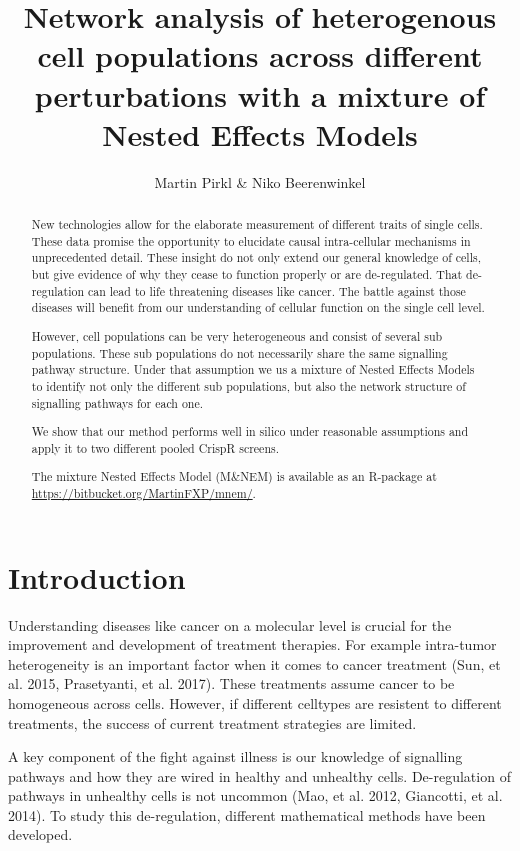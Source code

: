 \documentclass[12pt]{article}
\title{Network analysis of heterogenous cell populations across different perturbations with a mixture of Nested Effects Models}
\author{Martin Pirkl \& Niko Beerenwinkel}
\begin{document}
\maketitle

\begin{abstract}
New technologies allow for the elaborate measurement of different traits of single cells. These data promise the opportunity to elucidate causal intra-cellular mechanisms in unprecedented detail. These insight do not only extend our general knowledge of cells, but give evidence of why they cease to function properly or are de-regulated. That de-regulation can lead to life threatening diseases like cancer. The battle against those diseases will benefit from our understanding of cellular function on the single cell level.

However, cell populations can be very heterogeneous and consist of several sub populations. These sub populations do not necessarily share the same signalling pathway structure. Under that assumption we us a mixture of Nested Effects Models to identify not only the different sub populations, but also the network structure of signalling pathways for each one.

We show that our method performs well in silico under reasonable assumptions and apply it to two different pooled CrispR screens.

The mixture Nested Effects Model (M\&NEM) is available as an R-package at \url{https://bitbucket.org/MartinFXP/mnem/}.
\end{abstract}

\section{Introduction}
Understanding diseases like cancer on a molecular level is crucial for the improvement and development of treatment therapies. For example intra-tumor heterogeneity is an important factor when it comes to cancer treatment (Sun, et al. 2015, Prasetyanti, et al. 2017). These treatments assume cancer to be homogeneous across cells. However, if different celltypes are resistent to different treatments, the success of current treatment strategies are limited.

A key component of the fight against illness is our knowledge of signalling pathways and how they are wired in healthy and unhealthy cells. De-regulation of pathways in unhealthy cells is not uncommon (Mao,  et al. 2012, Giancotti, et al. 2014). To study this de-regulation, different mathematical methods have been developed.
\end{document}
